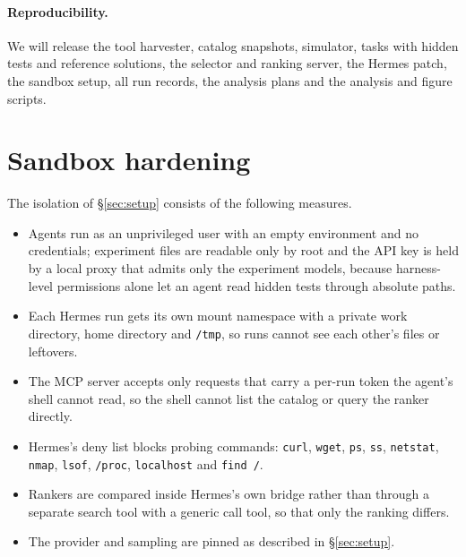 \documentclass[11pt]{article}
\begin{document}
\paragraph{Reproducibility.} We will release the tool harvester, catalog snapshots, simulator, tasks with hidden tests
and reference solutions, the selector and ranking server, the Hermes patch, the sandbox setup, all run records, the
analysis plans and the analysis and figure scripts.




\appendix
\section{Sandbox hardening}\label{app:hardening}
The isolation of \S\ref{sec:setup} consists of the following measures.
\begin{itemize}
\item Agents run as an unprivileged user with an empty environment and no credentials; experiment files are readable
only by root and the API key is held by a local proxy that admits only the experiment models, because harness-level
permissions alone let an agent read hidden tests through absolute paths.
\item Each Hermes run gets its own mount namespace with a private work directory, home directory and \texttt{/tmp}, so
runs cannot see each other's files or leftovers.
\item The MCP server accepts only requests that carry a per-run token the agent's shell cannot read, so the shell cannot
list the catalog or query the ranker directly.
\item Hermes's deny list blocks probing commands: \texttt{curl}, \texttt{wget}, \texttt{ps}, \texttt{ss},
\texttt{netstat}, \texttt{nmap}, \texttt{lsof}, \texttt{/proc}, \texttt{localhost} and \texttt{find /}.
\item Rankers are compared inside Hermes's own bridge rather than through a separate search tool with a generic call
tool, so that only the ranking differs.
\item The provider and sampling are pinned as described in \S\ref{sec:setup}.
\end{itemize}

\end{document}
